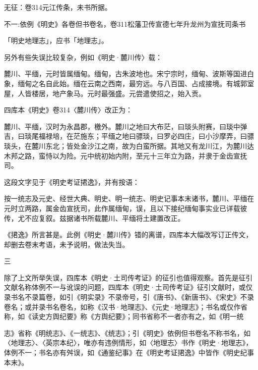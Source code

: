 无征：卷314元江传条，未书所据。


\noindent 不一:依例《明史》各卷但书卷名，卷311松藩卫传宣德七年升龙州为宣抚司条书

\begin{BookQuote}
「明史地理志」，应书「地理志」。
\end{BookQuote}

另外有些失误比较复杂，例如《明史·麓川传〉载：

\begin{BookQuote}
麓川、平缅，元时皆属缅甸。缅甸，古朱波地也。宋宁宗时，缅甸、波斯等国进白象，缅甸之名自此始。缅在云南之西南，最穷远。与八百国、占成接境。有城郭室屋，人皆楼居，地产象马。元时最强盛。元尝遣使招之，始入贡。
\end{BookQuote}

四库本《明史》卷314〈麓川传〉改正为：

\begin{BookQuote}
麓川、平缅，汉时为永昌郡，檄外。麓川之地曰大布茫，曰琰头附赛，曰琰中弹吉，曰琰尾福禄培，在茫施东；平缅之地曰骠琰，曰罗必四庄，曰小沙摩弄，曰骠琰头，在麓川东北；皆处金沙江之南，故为白蛮所据。其地又有龙川江，为麓川达木邦之路，蛮恃以为险。元中统初始内附，至元十三年立为路，并隶于金齿宣抚司。
\end{BookQuote}

这段文字见于《明史考证捃逸》，并有按语：

\begin{BookQuote}
按一统志及元史、经世大典、明史、明一统志、明史记事本末诸书，麓川、平缅在元时立两路，属金齿宣抚司，此作属缅甸，误，且以下接纪缅甸事实业已详载彼传，尤不应复叙。兹据诸书所载麓川、平缅将土建置改正。
\end{BookQuote}

《捃逸》所言甚是。此例《明史·麓川传》错的离谱，四库本大幅改写订正传文，却删去卷末考语，未予说明，做法失当。

三

除了上文所举失误，四库本《明史·土司传考证》的征引也值得观察。首先是征引文献名称体例不一与讹误的问题，四库本《明史·土司传考证》征引文献时，或仅录书名不录篇卷，如引《明实录》不录帝号，引《唐书》、《新唐书》、《宋史》不录卷名；或并录书名卷名，如称《汉书·地理志》、《元史·地理志》；书名或仅作省称，如《读史方舆纪要》称《方舆纪要》；同书省称不一者亦有之，如《明一统


\noindent 志》省称《明统志》、《一统志》、《统志》；引《明史》依例但书卷名不称书名，如〈地理志〉、〈英宗本纪〉，唯亦有违例情形，如〈地理志〉书作《明史·地理志》，体例不一；书名亦有舛误，如《通鉴纪事》在《明史考证捃逸》中皆作《明史纪事本末》。


